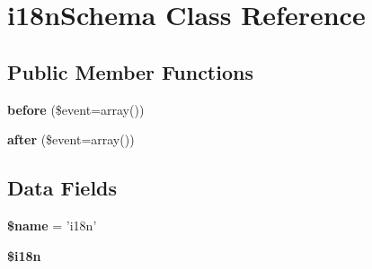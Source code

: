 \hypertarget{classi18n_schema}{
\section{i18nSchema Class Reference}
\label{classi18n_schema}
}
\subsection*{Public Member Functions}
\begin{DoxyCompactItemize}
\item 
\hypertarget{classi18n_schema_a3520fea3fe761944de85bdb84faff032}{
{\bfseries before} (\$event=array())}
\label{classi18n_schema_a3520fea3fe761944de85bdb84faff032}

\item 
\hypertarget{classi18n_schema_a39eb72bb9d764d16cdf7fc1e1a84c504}{
{\bfseries after} (\$event=array())}
\label{classi18n_schema_a39eb72bb9d764d16cdf7fc1e1a84c504}

\end{DoxyCompactItemize}
\subsection*{Data Fields}
\begin{DoxyCompactItemize}
\item 
\hypertarget{classi18n_schema_ab2fc40d43824ea3e1ce5d86dee0d763b}{
{\bfseries \$name} = 'i18n'}
\label{classi18n_schema_ab2fc40d43824ea3e1ce5d86dee0d763b}

\item 
{\bfseries \$i18n}
\end{DoxyCompactItemize}


